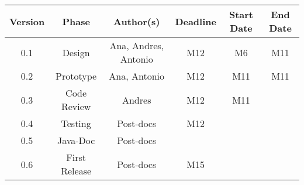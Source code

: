 \begin{table}[H]
\begin{tabular}{cccccc}
\hline
\textbf{Version} & \textbf{Phase} & \textbf{Author(s)} & \textbf{Deadline} & \textbf{Start Date} & \textbf{End Date}\\
\hline
0.1 & Design & Ana, Andres, Antonio &  M12 & M6 & M11\\
\hline 
0.2 & Prototype & Ana, Antonio &  M12  & M11 & M11\\
\hline 
0.3 & Code Review & Andres &  M12  & M11 & \\
\hline 
0.4 & Testing & Post-docs & M12 &  & \\
\hline 
0.5 & Java-Doc  & Post-docs &  &  & \\
\hline 
0.6 & First Release & Post-docs & M15 &  & \\
\hline
\end{tabular}
\end{table}

